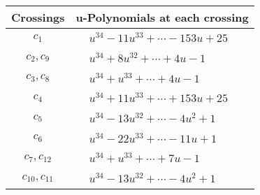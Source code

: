 \documentclass[1p]{elsarticle_modified}
\theoremstyle{definition}
\begin{document}
\begin{tabular}{m{50pt}|m{274pt}}
Crossings & \hspace{64pt}u-Polynomials at each crossing \\
\hline $$\begin{aligned}c_{1}\end{aligned}$$&$\begin{aligned}
&u^{34}-11 u^{33}+\cdots-153 u+25
\end{aligned}$\\
\hline $$\begin{aligned}c_{2},c_{9}\end{aligned}$$&$\begin{aligned}
&u^{34}+8 u^{32}+\cdots+4 u-1
\end{aligned}$\\
\hline $$\begin{aligned}c_{3},c_{8}\end{aligned}$$&$\begin{aligned}
&u^{34}+u^{33}+\cdots+4 u-1
\end{aligned}$\\
\hline $$\begin{aligned}c_{4}\end{aligned}$$&$\begin{aligned}
&u^{34}+11 u^{33}+\cdots+153 u+25
\end{aligned}$\\
\hline $$\begin{aligned}c_{5}\end{aligned}$$&$\begin{aligned}
&u^{34}-13 u^{32}+\cdots-4 u^2+1
\end{aligned}$\\
\hline $$\begin{aligned}c_{6}\end{aligned}$$&$\begin{aligned}
&u^{34}-22 u^{33}+\cdots-11 u+1
\end{aligned}$\\
\hline $$\begin{aligned}c_{7},c_{12}\end{aligned}$$&$\begin{aligned}
&u^{34}+u^{33}+\cdots+7 u-1
\end{aligned}$\\
\hline $$\begin{aligned}c_{10},c_{11}\end{aligned}$$&$\begin{aligned}
&u^{34}-13 u^{32}+\cdots-4 u^2+1
\end{aligned}$\\
\hline
\end{tabular}\\~\\
\end{document}
